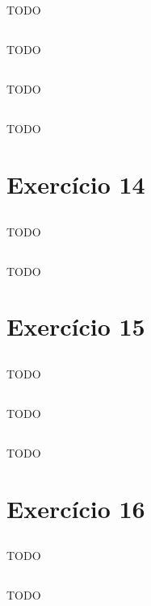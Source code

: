 \documentclass{article}
\begin{document}
\subsection{}
TODO
\subsection{}
TODO
\subsection{}
TODO
\subsection{}
TODO

\section{Exercício 14}
\subsection{}
TODO
\subsection{}
TODO

\section{Exercício 15}
\subsection{}
TODO
\subsection{}
TODO
\subsection{}
TODO

\section{Exercício 16}
\subsection{}
TODO
\subsection{}
TODO
\end{document}
